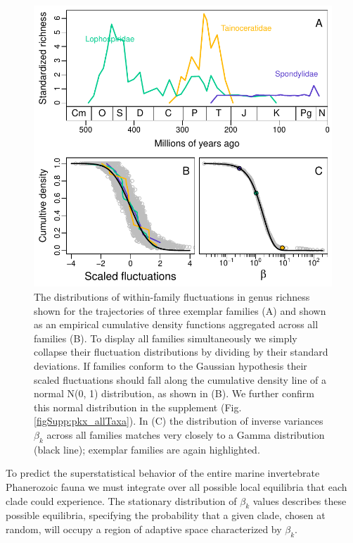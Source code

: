 \documentclass[12pt]{article}
\begin{document}
\begin{figure}[!h]
  \centering
  \includegraphics[scale=0.8]{../../fig_pkx-fbeta.pdf}
  \caption[Variability in trajectories of within-family fluctuations
  in genus richness]{The distributions of within-family fluctuations
    in genus richness shown for the trajectories of three exemplar
    families (A) and shown as an empirical cumulative density
    functions aggregated across all families (B). To display all
    families simultaneously we simply collapse their fluctuation
    distributions by dividing by their standard deviations. If
    families conform to the Gaussian hypothesis their scaled
    fluctuations should fall along the cumulative density line of a
    normal N(0, 1) distribution, as shown in (B). We further confirm
    this normal distribution in the supplement
    (Fig. \ref{figSupp:pkx_allTaxa}). In (C) the distribution of
    inverse variances $\beta_k$ across all families matches very
    closely to a Gamma distribution (black line); exemplar families
    are again highlighted.}
  \label{fig:pk_f}
\end{figure}


To predict the superstatistical behavior of the entire marine
invertebrate Phanerozoic fauna we must integrate over all possible
local equilibria that each clade could experience. The stationary
distribution of $\beta_k$ values describes these possible equilibria,
specifying the probability that a given clade, chosen at random, will
occupy a region of adaptive space characterized by $\beta_k$.
\end{document}
